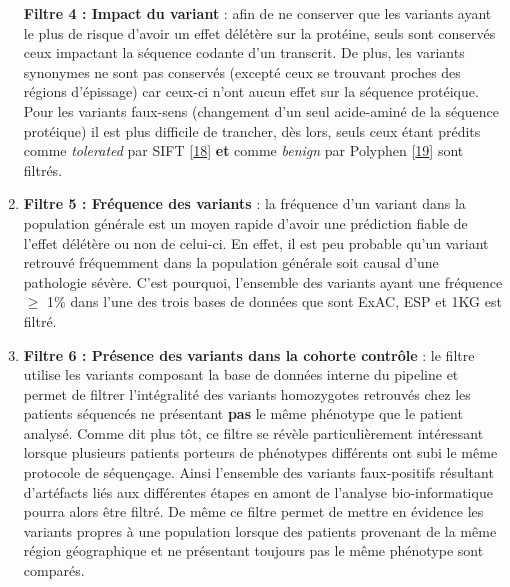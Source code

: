 \documentclass[12pt,a4paper,twoside]{ugathesis}
\begin{document}
\begin{enumerate}
  \textbf{Filtre 4 : Impact du variant} : afin de ne conserver que les
  variants ayant le plus de risque d'avoir un effet délétère sur la
  protéine, seuls sont conservés ceux impactant la séquence codante d'un
  transcrit. De plus, les variants synonymes ne sont pas conservés
  (excepté ceux se trouvant proches des régions d'épissage) car ceux-ci
  n'ont aucun effet sur la séquence protéique. Pour les variants
  faux-sens (changement d'un seul acide-aminé de la séquence protéique)
  il est plus difficile de trancher, dès lors, seuls ceux étant prédits
  comme \emph{tolerated} par SIFT
  {[}\protect\hyperlink{ref-Kumar2009}{18}{]} \textbf{et} comme
  \emph{benign} par Polyphen
  {[}\protect\hyperlink{ref-Adzhubei2010}{19}{]} sont filtrés.
\item
  \textbf{Filtre 5 : Fréquence des variants} : la fréquence d'un variant
  dans la population générale est un moyen rapide d'avoir une prédiction
  fiable de l'effet délétère ou non de celui-ci. En effet, il est peu
  probable qu'un variant retrouvé fréquemment dans la population
  générale soit causal d'une pathologie sévère. C'est pourquoi,
  l'ensemble des variants ayant une fréquence \(\ge\) 1\% dans l'une des
  trois bases de données que sont ExAC, ESP et 1KG est filtré.
\item
  \textbf{Filtre 6 : Présence des variants dans la cohorte contrôle} :
  le filtre utilise les variants composant la base de données interne du
  pipeline et permet de filtrer l'intégralité des variants homozygotes
  retrouvés chez les patients séquencés ne présentant \textbf{pas} le
  même phénotype que le patient analysé. Comme dit plus tôt, ce filtre
  se révèle particulièrement intéressant lorsque plusieurs patients
  porteurs de phénotypes différents ont subi le même protocole de
  séquençage. Ainsi l'ensemble des variants faux-positifs résultant
  d'artéfacts liés aux différentes étapes en amont de l'analyse
  bio-informatique pourra alors être filtré. De même ce filtre permet de
  mettre en évidence les variants propres à une population lorsque des
  patients provenant de la même région géographique et ne présentant
  toujours pas le même phénotype sont comparés.
\end{enumerate}
\end{document}
